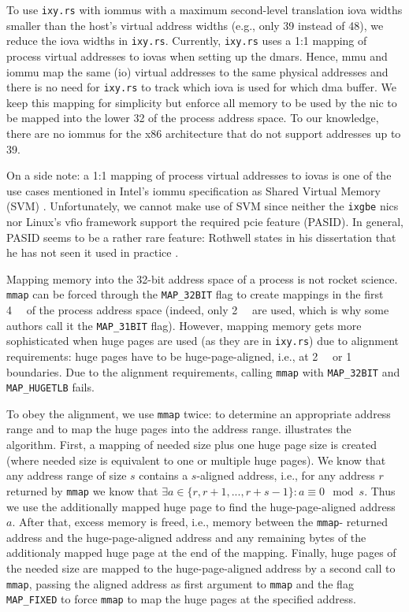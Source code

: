 To use \texttt{ixy.rs} with \acp{iommu} with a maximum second-level translation
\ac{iova} widths smaller than the host's virtual address widths (e.g., only 39
instead of \SI{48}{\bit}), we reduce the \ac{iova} widths in \texttt{ixy.rs}.
Currently, \texttt{ixy.rs} uses a 1:1 mapping of process virtual addresses to
\acp{iova} when setting up the \acp{dmar}. Hence, \ac{mmu} and \ac{iommu} map
the same (\ac{io}) virtual addresses to the same physical addresses and there is
no need for \texttt{ixy.rs} to track which \ac{iova} is used for which \ac{dma}
buffer. We keep this mapping for simplicity but enforce all memory to be used by
the \ac{nic} to be mapped into the lower \SI{32}{\bit} of the process address
space. To our knowledge, there are no \acp{iommu} for the x86 architecture that
do not support addresses up to \SI{39}{\bit}.

On a side note: a 1:1 mapping of process virtual addresses to \acp{iova} is one
of the use cases mentioned in Intel's \ac{iommu} specification as Shared Virtual
Memory (SVM) \cite[p.~21]{intel2019iommu}. Unfortunately, we cannot make use of
SVM since neither the \texttt{ixgbe} \acp{nic} nor Linux's \ac{vfio} framework
support the required \ac{pcie} feature (PASID). In general, PASID seems to be a
rather rare feature: Rothwell states in his dissertation that he has not seen it
used in practice \cite[p.~31]{rothwell2018exploitation}.

Mapping memory into the 32-bit address space of a process is not rocket science.
\texttt{mmap} can be forced through the \texttt{MAP\_32BIT} flag to create
mappings in the first \SI{4}{\gibi\byte} of the process address space (indeed,
only \SI{2}{\gibi\byte} are used, which is why some authors call it the
\texttt{MAP\_31BIT} flag). However, mapping memory gets more sophisticated when
huge pages are used (as they are in \texttt{ixy.rs}) due to alignment
requirements: huge pages have to be huge-page-aligned, i.e., at
\SI{2}{\mebi\byte} or \SI{1}{\gibi\byte} boundaries. Due to the alignment
requirements, calling \texttt{mmap} with \texttt{MAP\_32BIT} and
\texttt{MAP\_HUGETLB} fails.

To obey the alignment, we use \texttt{mmap} twice: to determine an appropriate
address range and to map the huge pages into the address range.
 illustrates the algorithm. First, a mapping of needed size
plus one huge page size is created (where needed size is equivalent to one or
multiple huge pages). We know that any address range of size $s$ contains a
$s$-aligned address, i.e., for any address $r$ returned by \texttt{mmap} we know
that ${\exists a \in \{r, r + 1, ..., r + s - 1\}: a \equiv 0 \mod s}$. Thus we
use the additionally mapped huge page to find the huge-page-aligned address $a$.
After that, excess memory is freed, i.e., memory between the \texttt{mmap}-
returned address and the huge-page-aligned address and any remaining bytes of
the additionaly mapped huge page at the end of the mapping. Finally, huge pages
of the needed size are mapped to the huge-page-aligned address by a second call
to \texttt{mmap}, passing the aligned address as first argument to \texttt{mmap}
and the flag \texttt{MAP\_FIXED} to force \texttt{mmap} to map the huge pages at
the specified address.

